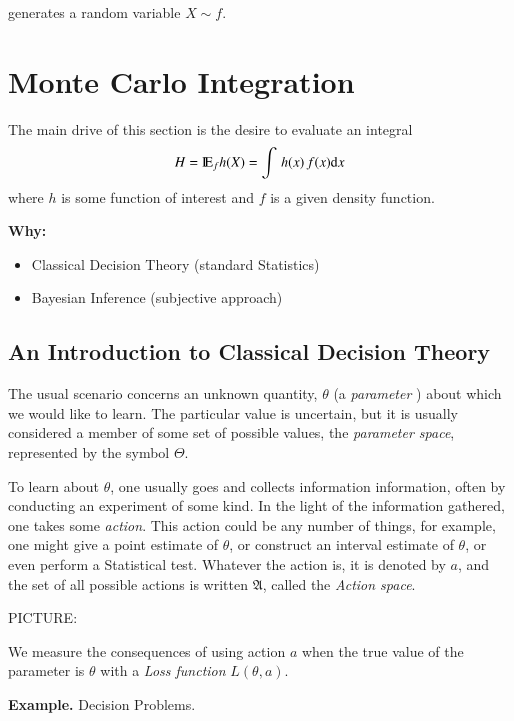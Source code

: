 \documentclass[captions=tableheading]{scrbook}
\begin{document}
generates a random variable $X \sim f$.
\chapter{Monte Carlo Integration}
\label{sec-3}


The main drive of this section is the desire to evaluate an integral
\[
H=\mathrm{I\hspace{-1.5pt}E}_{f}h(X)=\int\, h(x)\, f(x)\mathrm{d} x
\]
 where $h$ is some function of interest and $f$ is a given density function.

\textbf{Why:}

\begin{itemize}
\item Classical Decision Theory (standard Statistics)
\item Bayesian Inference (subjective approach)
\end{itemize}
\section{An Introduction to Classical Decision Theory}
\label{sec-3_1}


The usual scenario concerns an unknown quantity, $\theta$ (a \emph{parameter} ) about which we would like to learn. The particular value is uncertain, but it is usually considered a member of some set of possible values, the \emph{parameter space}, represented by the symbol $\Theta$.

To learn about $\theta$, one usually goes and collects information information, often by conducting an experiment of some kind. In the light of the information gathered, one takes some \emph{action}. This action could be any number of things, for example, one might give a point estimate of $\theta$, or construct an interval estimate of $\theta$, or even perform a Statistical test. Whatever the action is, it is denoted by $a$, and the set of all possible actions is written $\mathfrak{A}$, called the \emph{Action space}.

PICTURE: 

\vspace{1.5in}


We measure the consequences of using action $a$ when the true value of the parameter is $\theta$ with a \emph{Loss function} $L(\theta,a)$.

\textbf{Example.} Decision Problems.
\end{document}
